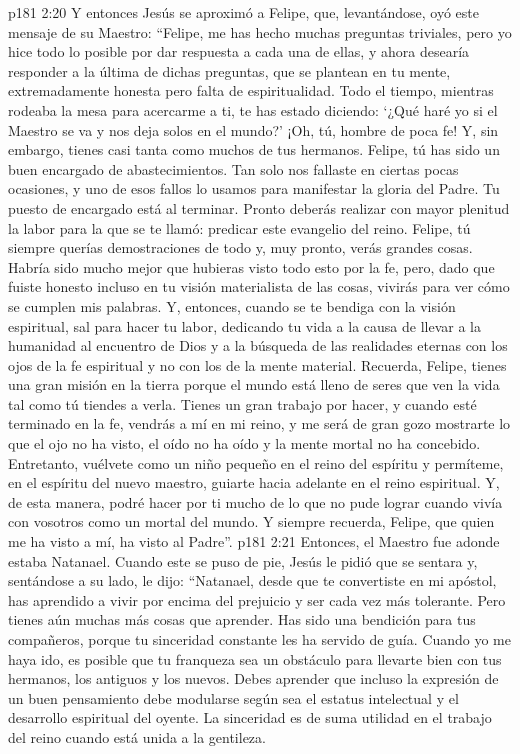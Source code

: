 \vs p181 2:20 \pc Y entonces Jesús se aproximó a Felipe, que, levantándose, oyó este mensaje de su Maestro: “Felipe, me has hecho muchas preguntas triviales, pero yo hice todo lo posible por dar respuesta a cada una de ellas, y ahora desearía responder a la última de dichas preguntas, que se plantean en tu mente, extremadamente honesta pero falta de espiritualidad. Todo el tiempo, mientras rodeaba la mesa para acercarme a ti, te has estado diciendo: ‘¿Qué haré yo si el Maestro se va y nos deja solos en el mundo?’ ¡Oh, tú, hombre de poca fe! Y, sin embargo, tienes casi tanta como muchos de tus hermanos. Felipe, tú has sido un buen encargado de abastecimientos. Tan solo nos fallaste en ciertas pocas ocasiones, y uno de esos fallos lo usamos para manifestar la gloria del Padre. Tu puesto de encargado está al terminar. Pronto deberás realizar con mayor plenitud la labor para la que se te llamó: predicar este evangelio del reino. Felipe, tú siempre querías demostraciones de todo y, muy pronto, verás grandes cosas. Habría sido mucho mejor que hubieras visto todo esto por la fe, pero, dado que fuiste honesto incluso en tu visión materialista de las cosas, vivirás para ver cómo se cumplen mis palabras. Y, entonces, cuando se te bendiga con la visión espiritual, sal para hacer tu labor, dedicando tu vida a la causa de llevar a la humanidad al encuentro de Dios y a la búsqueda de las realidades eternas con los ojos de la fe espiritual y no con los de la mente material. Recuerda, Felipe, tienes una gran misión en la tierra porque el mundo está lleno de seres que ven la vida tal como tú tiendes a verla. Tienes un gran trabajo por hacer, y cuando esté terminado en la fe, vendrás a mí en mi reino, y me será de gran gozo mostrarte lo que el ojo no ha visto, el oído no ha oído y la mente mortal no ha concebido. Entretanto, vuélvete como un niño pequeño en el reino del espíritu y permíteme, en el espíritu del nuevo maestro, guiarte hacia adelante en el reino espiritual. Y, de esta manera, podré hacer por ti mucho de lo que no pude lograr cuando vivía con vosotros como un mortal del mundo. Y siempre recuerda, Felipe, que quien me ha visto a mí, ha visto al Padre”.
\vs p181 2:21 \pc Entonces, el Maestro fue adonde estaba Natanael. Cuando este se puso de pie, Jesús le pidió que se sentara y, sentándose a su lado, le dijo: “Natanael, desde que te convertiste en mi apóstol, has aprendido a vivir por encima del prejuicio y ser cada vez más tolerante. Pero tienes aún muchas más cosas que aprender. Has sido una bendición para tus compañeros, porque tu sinceridad constante les ha servido de guía. Cuando yo me haya ido, es posible que tu franqueza sea un obstáculo para llevarte bien con tus hermanos, los antiguos y los nuevos. Debes aprender que incluso la expresión de un buen pensamiento debe modularse según sea el estatus intelectual y el desarrollo espiritual del oyente. La sinceridad es de suma utilidad en el trabajo del reino cuando está unida a la gentileza.
